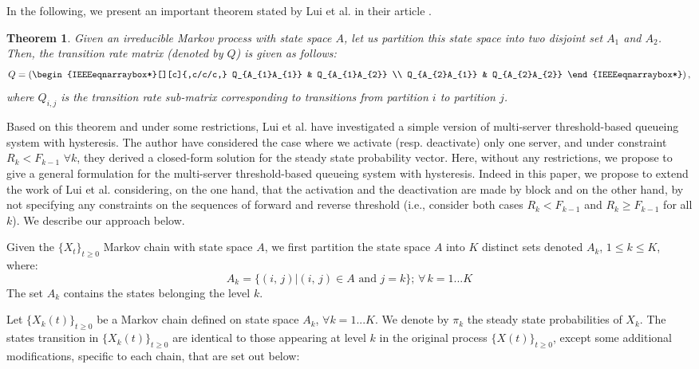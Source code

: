 \documentclass[conference]{IEEEtran}
\newtheorem{thm}{Theorem}
\begin{document}
In the following, we present an important theorem stated by  Lui et al.   in their article \cite{lui1999stochastic}.%
\begin{thm}
\label{thm:thm1}
Given an irreducible Markov process with state space $A$, let us partition this state space into two disjoint set $A_1$ and $A_2$.
Then, the transition rate matrix (denoted by $Q$) is given as follows:
\begin{equation*}
Q = \left(\begin{IEEEeqnarraybox*}[][c]{,c/c/c,}
    Q_{A_{1}A_{1}}       & Q_{A_{1}A_{2}} \\
    Q_{A_{2}A_{1}}       & Q_{A_{2}A_{2}} %
\end{IEEEeqnarraybox*}\right),
\end{equation*}
where $Q_{i,j}$ is the transition rate sub-matrix corresponding to transitions from partition $i$ to partition $j$.
\end{thm}


Based on this theorem and under some restrictions, Lui et al. have investigated a simple version of multi-server threshold-based queueing system with hysteresis. The author have considered the case where we activate (resp. deactivate) only one server, and under constraint $R_k<F_{k-1}$ $\forall k$, they  derived a closed-form solution for the steady state probability vector. Here, without any restrictions, we propose to give a general formulation for the multi-server threshold-based queueing system with hysteresis. Indeed in this paper, we propose to extend the work of Lui et al. considering, on the one hand, that the activation and the deactivation are made by block and on the other hand, by not specifying any constraints on the sequences of forward and reverse threshold  (i.e., consider both cases $R_k<F_{k-1}$ and $R_k\geq F_{k-1}$ for all $k$). We describe  our approach below.




Given the $\{X_{t}\}_{t \geq 0}$ Markov chain with state space $A$,  we first partition the state space  $A$ into $K$ distinct sets
denoted $A_{k}$, $1 \leq k \leq K$, where:
\begin{equation}
A_{k}=\{(i,\,j)|(i,\,j) \in A \mbox{ and } j=k\}; \, \forall \, k=1...K
\end{equation}
The set $A_{k}$ contains the states belonging the level $k$.

Let $\{X_{k}(t)\}_{t \geq 0}$ be a Markov chain defined on state space $A_{k}$, $\forall k=1...K$.
We denote by  $\pi_{k}$ the steady state probabilities of $X_{k}$.
The states transition in $\{X_{k}(t)\}_{t \geq 0}$ are identical to those appearing at level $k$ in the original process $\{X(t)\}_{t \geq 0}$, except some additional modifications, specific to each chain, that are set out below:
\end{document}
